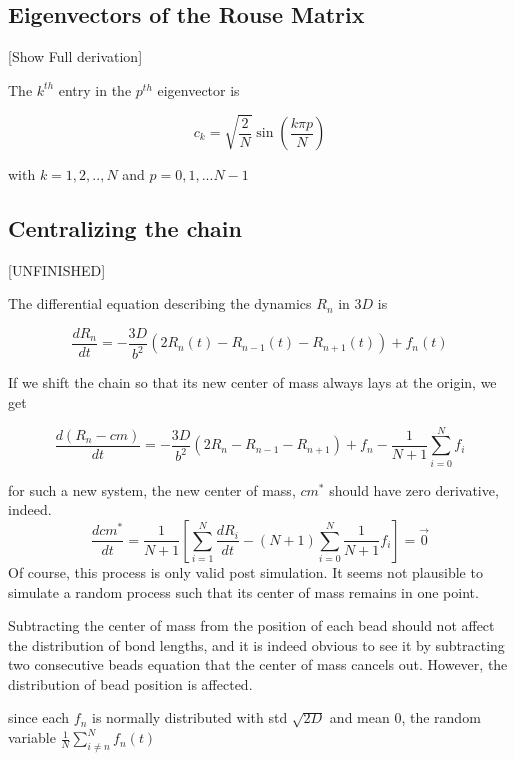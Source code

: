 \documentclass{paper}
\begin{document}
\subsection{Eigenvectors of the Rouse Matrix}\label{subsection_eigenvectorsOfTheRouseMatrix}
[Show Full derivation]

The $k^{th}$ entry in the $p^{th}$ eigenvector is 

\begin{equation*}
c_k = \sqrt{\frac{2}{N}}\sin(\frac{k\pi p}{N})
\end{equation*}

with $k=1,2,..,N$ and $p=0,1,...N-1$

\subsection{Centralizing the chain}\label{subsection_centralizingTheChain}
[UNFINISHED]

The differential equation describing the dynamics $R_n$ in $3D$ is

\begin{equation*}
\frac{dR_n}{dt} = -\frac{3D}{b^2}\left(2R_n(t)-R_{n-1}(t)-R_{n+1}(t) \right)+f_n(t)
\end{equation*}

If we shift the chain so that its new center of mass always lays at the origin, we get 

 \begin{equation*}
\frac{d(R_n-cm)}{dt} = -\frac{3D}{b^2}\left(2R_n-R_{n-1}-R_{n+1} \right)+f_n-\frac{1}{N+1}\sum_{i=0}^Nf_i
\end{equation*}

for such a new system, the new center of mass, $cm^*$ should have zero derivative, indeed. 
\begin{equation*}
\frac{dcm^*}{dt}=\frac{1}{N+1}\left[ \sum_{i=1}^N\frac{dR_i}{dt} - (N+1)\sum_{i=0}^N\frac{1}{N+1}f_i \right]= \vec{0}
\end{equation*}
Of course, this process is only valid post simulation. It seems not plausible to simulate a random process such that its center of mass remains in one point. 

Subtracting the center of mass from the position of each bead should not affect the distribution of bond lengths, and it is indeed obvious to see it by subtracting two consecutive beads equation that the center of mass cancels out. However, the distribution of bead position is affected. 

since each $f_n$ is normally distributed with std $\sqrt{2D}$ and mean 0, the random variable $\frac{1}{N}\sum_{i\neq n}^Nf_n(t)$ 
\end{document}
